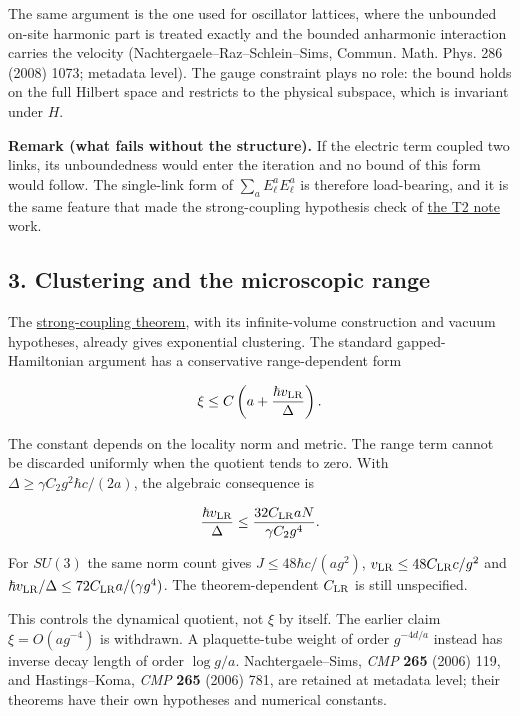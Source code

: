 \documentclass[11pt,a4paper]{article}
\begin{document}
The same argument is the one used for oscillator lattices, where the
unbounded on-site harmonic part is treated exactly and the bounded
anharmonic interaction carries the velocity
(Nachtergaele--Raz--Schlein--Sims, Commun. Math. Phys. 286 (2008) 1073;
metadata level). The gauge constraint plays no role: the bound holds on
the full Hilbert space and restricts to the physical subspace, which is
invariant under \(H\).

\textbf{Remark (what fails without the structure).} If the electric term
coupled two links, its unboundedness would enter the iteration and no
bound of this form would follow. The single-link form of
\(\sum_a E^a_\ell E^a_\ell\) is therefore load-bearing, and it is the
same feature that made the strong-coupling hypothesis check of
\href{strong-coupling-uniform-gap.md}{the T2 note} work.

\hypertarget{clustering-and-the-microscopic-range}{%
\subsection{3. Clustering and the microscopic
range}\label{clustering-and-the-microscopic-range}}

The \href{strong-coupling-uniform-gap.md}{strong-coupling theorem}, with
its infinite-volume construction and vacuum hypotheses, already gives
exponential clustering. The standard gapped-Hamiltonian argument has a
conservative range-dependent form

\[\xi\le C\left(a+\frac{\hbar v_{\rm LR}}{\Delta}\right).\]

The constant depends on the locality norm and metric. The range term
cannot be discarded uniformly when the quotient tends to zero. With
\(\Delta\ge\gamma C_2g^2\hbar c/(2a)\), the algebraic consequence is

\[\frac{\hbar v_{\rm LR}}{\Delta}
 \le\frac{32C_{\rm LR}aN}{\gamma C_2g^4}.\]

For \(SU(3)\) the same norm count gives \(J\le48\hbar c/(ag^2)\),
\(v_{\rm LR}\le48C_{\rm LR}c/g^2\) and
\(\hbar v_{\rm LR}/\Delta\le72C_{\rm LR}a/(\gamma g^4)\). The
theorem-dependent \(C_{\rm LR}\) is still unspecified.

This controls the dynamical quotient, not \(\xi\) by itself. The earlier
claim \(\xi=O(ag^{-4})\) is withdrawn. A plaquette-tube weight of order
\(g^{-4d/a}\) instead has inverse decay length of order \(\log g/a\).
Nachtergaele--Sims, \emph{CMP} \textbf{265} (2006) 119, and
Hastings--Koma, \emph{CMP} \textbf{265} (2006) 781, are retained at
metadata level; their theorems have their own hypotheses and numerical
constants.
\end{document}
